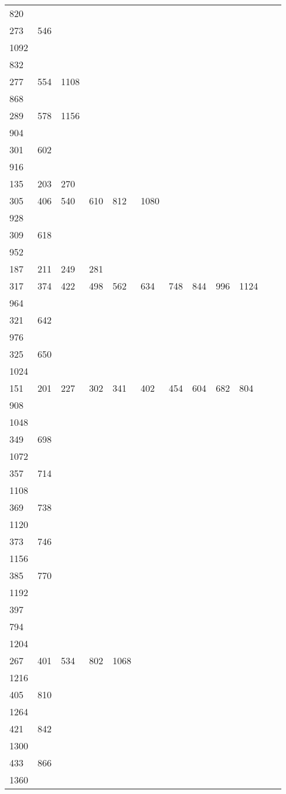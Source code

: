 \begin{longtable}{llllllllllll}
820&&&&&&&&&&&\\
273& 546\\
1092& \\
832&&&&&&&&&&&\\
277& 554& 1108& \\
868&&&&&&&&&&&\\
289& 578& 1156& \\
904&&&&&&&&&&&\\
301& 602& \\
916&&&&&&&&&&&\\
135& 203& 270\\
305& 406& 540& 610& 812& 1080& \\
928&&&&&&&&&&&\\
309& 618& \\
952&&&&&&&&&&&\\
187& 211& 249& 281\\
317& 374& 422& 498& 562& 634& 748& 844& 996& 1124& \\
964&&&&&&&&&&&\\
321& 642\\
976&&&&&&&&&&&\\
325& 650& \\
1024&&&&&&&&&&&\\
151& 201& 227& 302& 341& 402& 454& 604& 682& 804\\
908& \\
1048&&&&&&&&&&&\\
349& 698& \\
1072&&&&&&&&&&&\\
357& 714& \\
1108&&&&&&&&&&&\\
369& 738& \\
1120&&&&&&&&&&&\\
373& 746& \\
1156&&&&&&&&&&&\\
385& 770& \\
1192&&&&&&&&&&&\\
397\\
794& \\
1204&&&&&&&&&&&\\
267& 401& 534& 802& 1068& \\
1216&&&&&&&&&&&\\
405& 810& \\
1264&&&&&&&&&&&\\
421& 842& \\
1300&&&&&&&&&&&\\
433& 866\\
1360&&&&&&&&&&&\\

\end{longtable}
